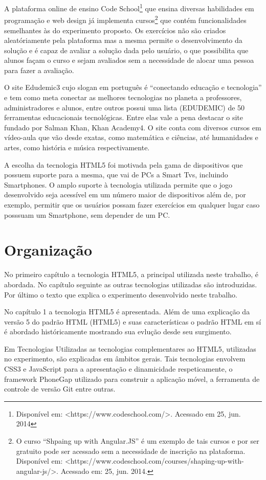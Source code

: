 	A plataforma online de ensino Code School\footnote{Disponível em: <https://www.codeschool.com/>. Acessado em 25, jun. 2014} que ensina diversas habilidades em programação e web design já implementa cursos\footnote{O curso “Shpaing up with Angular.JS” é um exemplo de tais cursos e por ser gratuito pode ser acessado sem a necessidade de inscrição na plataforma. Disponível em: <https://www.codeschool.com/courses/shaping-up-with-angular-js/>. Acessado em: 25, jun. 2014.} que contém funcionalidades semelhantes às do experimento proposto. Os exercícios não são criados aleatóriamente pela plataforma mas a mesma permite o desenvolvimento da solução e é capaz de avaliar a solução dada pelo usuário, o que possibilita que alunos façam o curso e sejam avaliados sem a necessidade de alocar uma pessoa para fazer a avaliação.
	
	O site Edudemic3 cujo slogan em português é “conectando educação e tecnologia” e tem como meta conectar as melhores tecnologias no planeta a professores, administradores e alunos, entre outros possui uma lista (EDUDEMIC) de 50 ferramentas educacionais tecnológicas. Entre elas vale a pena destacar o site fundado por Salman Khan, Khan Academy4. O site conta com diversos cursos em vídeo-aula que vão desde exatas, como matemática e ciências, até humanidades e artes, como história e música respectivamente.
	
	A escolha da tecnologia HTML5 foi motivada pela gama de dispositivos que possuem suporte para a mesma, que vai de PCs a Smart Tvs, incluindo Smartphones. O amplo suporte à tecnologia utilizada permite que o jogo desenvolvido seja acessível em um número maior de dispositivos além de, por exemplo, permitir que os usuários possam fazer exercícios em qualquer lugar caso posssuam um Smartphone, sem depender de um PC.
	
\section{Organização}
No primeiro capítulo a tecnologia HTML5, a principal utilizada neste trabalho, é abordada. No capítulo seguinte as outras tecnologias utilizadas são introduzidas. Por último o texto que explica o experimento desenvolvido neste trabalho.

	No capítulo 1 a tecnologia HTML5 é apresentada. Além de uma explicação da versão 5 do padrão HTML (HTML5) e suas características o padrão HTML em sí é abordado históricamente mostrando sua evlução desde seu surgimento.
	
	Em Tecnologias Utilizadas as tecnologias complementares ao HTML5, utilizadas no experimento, são  explicadas em âmbitos gerais. Tais tecnologias envolvem CSS3 e JavaScript para a apresentação e dinamicidade respeticamente, o framework PhoneGap utilizado para construir a aplicação móvel, a ferramenta de controle de versão Git entre outras.
	
